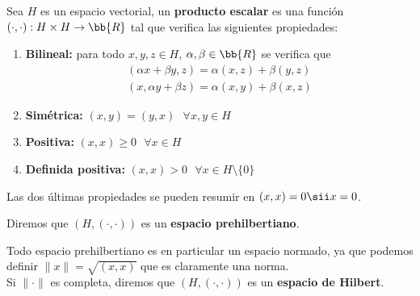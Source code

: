 \begin{definicion}
    Sea $H$ es un espacio vectorial, un \textbf{producto escalar} es una función $(\cdot,\cdot):H\times H \to \bb{R}$ tal que verifica las siguientes propiedades:
    \begin{enumerate}
        \item \textbf{Bilineal:} para todo $x,y,z\in H$, $\alpha, \beta \in \bb{R}$ se verifica que 
        \begin{align*}
            (\alpha x + \beta y, z) = \alpha(x,z) + \beta(y,z)\\
            (x, \alpha y + \beta z) = \alpha(x,y) + \beta(x,z)
        \end{align*}

        \item \textbf{Simétrica:} $(x,y) = (y,x) \ \ \ \forall x,y\in H$
         
        \item \textbf{Positiva:} $(x,x)\geq 0  \ \ \ \forall x \in H$

        \item \textbf{Definida positiva:} $(x,x) > 0 \ \ \ \forall x \in H\setminus\{0\}$
    \end{enumerate}

    Las dos últimas propiedades se pueden resumir en $(x,x) = 0 \sii x=0$.
    
    Diremos que $(H, (\cdot, \cdot))$ es un \textbf{espacio prehilbertiano}.

    Todo espacio prehilbertiano es en particular un espacio normado, ya que podemos definir $\|x\| = \sqrt{(x,x)}$ que es claramente una norma.\\

    Si $\|\cdot\|$ es completa, diremos que $(H, (\cdot,\cdot))$ es un \textbf{espacio de Hilbert}.
\end{definicion}

